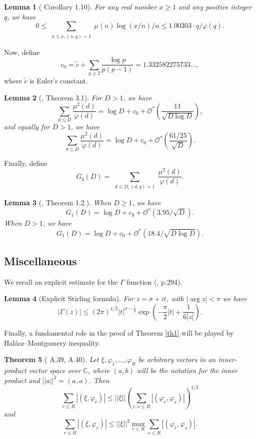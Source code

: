 \documentclass[reqno]{amsart}
\newtheorem{theorem}{Theorem}[section]
\newtheorem{lemma}[theorem]{Lemma}
\numberwithin{equation}{section}
\theoremstyle{remark}
\begin{document}
\begin{lemma}[\cite{Ramare15} Corollary 1.10]\label{rammulog}
     For any real number $x \geq 1$ and any positive integer $q$, we have
$$
0\le \sum_{\substack{n \leq x,(n, q)=1}} \mu(n) \log (x / n) / n \leq 1.00303 \cdot q / \varphi(q).
$$
\end{lemma}
Now, define
\begin{equation*}
c_0=\tilde{c}+\sum_{p \geq  2} \frac{\log p}{p(p-1)}=1.332582275733 \ldots,
\end{equation*}
where $\tilde{c}$ is Euler's constant.
\begin{lemma}[\cite{ramare_explicit_2019}, Theorem 3.1]\label{estwithphi}
For $D>1$, we have
$$
\sum_{d \leq  D} \frac{\mu^2(d)}{\varphi(d)}=\log D+c_0+\mathcal{O}^*\left(\frac{11}{\sqrt{D \log D}}\right),
$$
and equally for $D>1$, we have
$$
\sum_{d \leq  D} \frac{\mu^2(d)}{\varphi(d)}=\log D+c_0+\mathcal{O}^*\left(\frac{61 / 25}{\sqrt{D}}\right).
$$
\end{lemma}
Finally, define
\begin{equation*}
G_q(D)=\sum_{\substack{d \leq D,(d, q)=1}} \frac{\mu^2(d)}{\varphi(d)}.
\end{equation*}
\begin{lemma}[\cite{ramare_explicit_2017}, Theorem 1.2.]\label{ramaregd} When $D \geq 1$, we have $$G_1(D)=\log D+c_0+\mathcal{O}^*(3.95 / \sqrt{D}).$$ When $D>1$, we have $$G_1(D)=\log D+c_0+\mathcal{O}^*(18.4 / \sqrt{D \log D}).$$
\end{lemma}
\subsection{Miscellaneous}
We recall an explicit estimate for the $\Gamma $ function (\cite{olver_asymptotics_1974}, p.294).
\begin{lemma}[Explicit Stirling formula]\label{stirling}
For $z=\sigma+it$, with $|\arg z| <\pi$ we have
\[
\left|\Gamma(z)\right|\le (2\pi)^{1/2}|t|^{\sigma-\frac{1}{2}}\exp\left(-\frac{\pi}{2}|t|+\frac{1}{6|z|}\right).
\]
\end{lemma}
Finally, a fundamental role in the proof of Theorem \ref{th1} will be played by Halász--Montgomery inequality.
\begin{theorem}[\cite{Ivic2003TheRZ} A.39, A.40]\label{montineq}
  Let $\xi,\varphi_1,\dots,\varphi_R$ be arbitrary vectors in an inner-product vector space over $\mathbb{C}$, where $(a,b)$ will be the notation for the inner product and $||a||^2=(a,a)$. Then
  \[
  \sum_{r\le R}|(\xi,\varphi_r)|\le ||\xi||\left(\sum_{r,s\le R}|(\varphi_r,\varphi_s)|\right)^{1/2}
  \]
  and
   \[
  \sum_{r\le R}|(\xi,\varphi_r)|\le ||\xi||^2\max_{r\le R}\sum_{s\le R}|(\varphi_r,\varphi_s)|.
  \]
\end{theorem}
\end{document}
